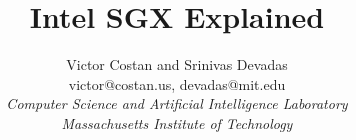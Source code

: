 \documentclass[11pt,twocolumn]{article}
\begin{document}
\title{Intel SGX Explained}
\author{Victor Costan and Srinivas Devadas \\
        victor@costan.us, devadas@mit.edu \\
        \em Computer Science and Artificial Intelligence Laboratory \\
        \em Massachusetts Institute of Technology}
\date{}

\maketitle










\setlength{\bibsep}{1pt}
\small

%
%

\end{document}
